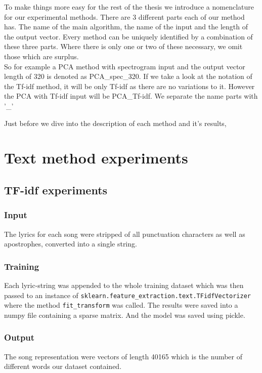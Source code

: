 To make things more easy for the rest of the thesis we introduce a nomenclature for our experimental methods. There are 3 different parts each of our method has. The name of the main algorithm, the name of the input and the length of the output vector. Every method can be uniquely identified by a combination of these three parts. Where there is only one or two of these necessary, we omit those which are surplus.\\
So for example a PCA method with spectrogram input and the output vector length of 320 is denoted as PCA\_spec\_320. If we take a look at the notation of the Tf-idf method, it will be only Tf-idf as there are no variations to it. However the PCA with Tf-idf input will be PCA\_Tf-idf. We separate the name parts with '\_' 

Just before we dive into the description of each method and it's results, 
\section{Text method experiments}

\subsection{TF-idf experiments}\label{ssec:TF_idf}


\subsubsection{Input}
The lyrics for each song were stripped of all punctuation characters as well as apostrophes, converted into a single string. 
\subsubsection{Training}
Each lyric-string was appended to the whole training dataset which was then passed to an instance of \texttt{sklearn.feature\_extraction.text.TFidfVectorizer} where the method \texttt{fit\_transform} was called. The results were saved into a numpy file containing a sparse matrix. And the model was saved using pickle.\\

\subsubsection{Output}
The song representation were vectors of length 40165 which is the number of different words our dataset contained.

